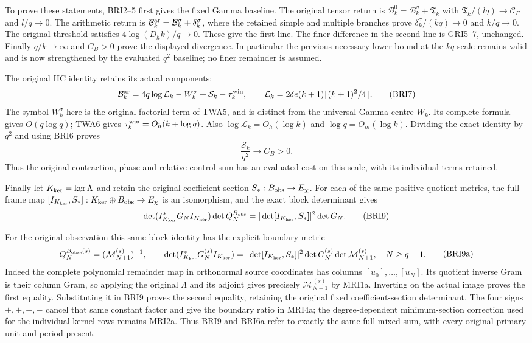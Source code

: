 \documentclass[11pt,a4paper]{article}
\begin{document}
To prove these statements, BRI2--5 first gives the fixed Gamma
baseline. The original tensor return is
$\mathcal B_k^0=\mathcal B_k^\sigma+\mathfrak T_k$ with
$\mathfrak T_k/(lq)\to\mathcal C_\Gamma$ and $l/q\to0$.
The arithmetic return is
$\mathcal B_k^{\rm ar}=\mathcal B_k^\sigma+\delta_k^\sigma$,
where the retained simple and multiple branches prove
$\delta_k^\sigma/(kq)\to0$ and $k/q\to0$.
The original threshold satisfies $4\log(D_hk)/q\to0$.
These give the first line. The finer difference in the second line
is GRI5--7, unchanged. Finally $q/k\to\infty$ and $C_B>0$
prove the displayed divergence. In particular the previous necessary
lower bound at the $kq$ scale remains valid and is now strengthened
by the evaluated $q^2$ baseline; no finer remainder is assumed.

The original HC identity retains its actual components:
\[
 \mathcal B_k^{\rm ar}=4q\log\mathcal L_k-W_k^\sigma
                  +\mathcal S_k-\tau_k^{\rm win},\qquad
 \mathcal L_k=2\delta e(k+1)\lfloor(k+1)^2/4\rfloor.
 \tag{BRI7}
\]
The symbol $W_k^\sigma$ here is the original factorial term of
TWA5, and is distinct from the universal Gamma centre $W_k$.
Its complete formula gives $O(q\log q)$; TWA6 gives
$\tau_k^{\rm win}=O_h(k+\log q)$. Also
$\log\mathcal L_k=O_h(\log k)$ and $\log q=O_m(\log k)$.
Dividing the exact identity by $q^2$ and using BRI6 proves
\[
 \frac{\mathcal S_k}{q^2}\longrightarrow C_B>0.
 \tag{BRI8}
\]
Thus the original contraction, phase and relative-control sum has
an evaluated cost on this scale, with its individual terms retained.

Finally let $K_{\rm ker}=\ker\Lambda$ and retain the original
coefficient section $S_*:B_{\rm obs}\to E_\chi$.
For each of the same positive quotient metrics, the full frame map
$[I_{K_{\rm ker}},S_*]:K_{\rm ker}\oplus B_{\rm obs}\to E_\chi$
is an isomorphism, and the exact block determinant gives
\[
 \det(I_{K_{\rm ker}}^*G_NI_{K_{\rm ker}})\det Q_N^{B_{\rm obs}}
 =|\det[I_{K_{\rm ker}},S_*]|^2\det G_N.
 \tag{BRI9}
\]

For the original observation this same block identity has the
explicit boundary metric
\[
\begin{gathered}
 Q_N^{B_{\rm obs},(s)}=(\mathcal M_{N+1}^{(s)})^{-1},\qquad
 \det(I_{K_{\rm ker}}^*G_N^{(s)}I_{K_{\rm ker}})
 =|\det[I_{K_{\rm ker}},S_*]|^2\det G_N^{(s)}
                                  \det\mathcal M_{N+1}^{(s)},
 \quad N\ge q-1.
\end{gathered}\tag{BRI9a}
\]
Indeed the complete polynomial remainder map in orthonormal
source coordinates has columns $[u_0],\ldots,[u_N]$.
Its quotient inverse Gram is their column Gram, so applying
the original $\Lambda$ and its adjoint gives precisely
$\mathcal M_{N+1}^{(s)}$ by MRI1a. Inverting on the actual
image proves the first equality. Substituting it in BRI9
proves the second equality, retaining the original fixed
coefficient-section determinant. The four signs
$+,+,-,-$ cancel that same constant factor and give the
boundary ratio in MRI4a; the degree-dependent minimum-section
correction used for the individual kernel rows remains MRI2a.
Thus BRI9 and BRI6a refer to exactly the same full mixed sum,
with every original primary unit and period present.
\end{document}
